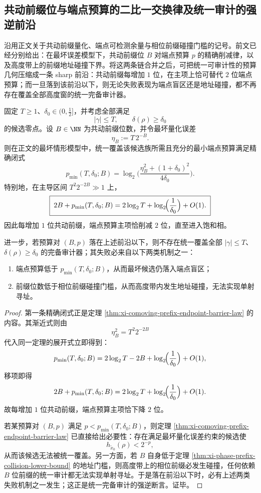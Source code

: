 \subsection{共动前缀位与端点预算的二比一交换律及统一审计的强逆前沿}\label{subsec:conclusion-comoving-prefix-endpoint-budget-strong-frontier}
沿用正文关于共动前缀量化、端点可检测余量与相位前缀碰撞门槛的记号。前文已经分别给出：在最坏误差模型下，共动前缀位 \(B\) 对端点预算 \(p\) 的精确削减律，以及高度带上的前缀地址碰撞下界。将这两条链合并之后，可把统一可审计性的预算几何压缩成一条 sharp 前沿：共动前缀每增加 \(1\) 位，在主项上恰可替代 \(2\) 位端点预算；而一旦落到该前沿以下，则无论失败表现为端点盲区还是地址碰撞，都不再存在覆盖全部高度窗的统一完备审计器。

\begin{theorem}[二比一预算交换与统一审计的强逆前沿]\label{thm:conclusion-comoving-prefix-endpoint-twoforone-strong-frontier}
固定 \(T\ge 1\)、\(\delta_0\in(0,\tfrac12]\)，并考虑全部满足
\[
|\gamma|\le T,
\qquad
\delta(\rho)\ge \delta_0
\]
的候选零点。设 \(B\in\NN\) 为共动前缀位数，并令最坏量化误差
\[
\eta_B:=T\,2^{-B}.
\]
则在正文的最坏情形模型中，统一覆盖该候选族所需且充分的最小端点预算满足精确闭式
\[
\boxed{\;
p_{\min}(T,\delta_0;B)
=
\log_2\!\Biggl(
\frac{\eta_B^2+(1+\delta_0)^2}{4\delta_0}
\Biggr).\;}
\]
特别地，在主导区间 \(T^2 2^{-2B}\gg 1\) 上，
\[
\boxed{\;
2B+p_{\min}(T,\delta_0;B)
=
2\log_2 T+\log_2\!\Bigl(\frac1{\delta_0}\Bigr)+O(1).\;}
\]
因此每增加 \(1\) 位共动前缀，端点预算主项恰削减 \(2\) 位，直至进入饱和相。

进一步，若预算对 \((B,p)\) 落在上述前沿以下，则不存在统一覆盖全部 \(|\gamma|\le T\)、\(\delta(\rho)\ge \delta_0\) 的完备审计器；其失败必来自以下两类机制之一：
\begin{enumerate}
  \item 端点预算低于 \(p_{\min}(T,\delta_0;B)\)，从而最坏候选仍落入端点盲区；
  \item 前缀位数低于相位前缀碰撞门槛，从而高度带内发生地址碰撞，无法实现单射寻址。
\end{enumerate}
\end{theorem}
\begin{proof}
第一条精确闭式正是定理 \ref{thm:xi-comoving-prefix-endpoint-barrier-law} 的内容。其渐近式则由
\[
\eta_B^2=T^2 2^{-2B}
\]
代入同一定理的展开式立即得到：
\[
p_{\min}(T,\delta_0;B)
=
2\log_2T-2B+\log_2\!\Bigl(\frac1{\delta_0}\Bigr)+O(1),
\]
移项即得
\[
2B+p_{\min}(T,\delta_0;B)
=
2\log_2T+\log_2\!\Bigl(\frac1{\delta_0}\Bigr)+O(1).
\]
故每增加 \(1\) 位共动前缀，端点预算主项恰下降 \(2\) 位。

若某预算对 \((B,p)\) 满足 \(p<p_{\min}(T,\delta_0;B)\)，则定理 \ref{thm:xi-comoving-prefix-endpoint-barrier-law} 已直接给出必要性：存在满足最坏量化误差约束的候选使
\[
h_{\tilde x_0}(\rho)<2^{-p},
\]
从而该候选无法被统一覆盖。另一方面，若 \(B\) 自身低于定理 \ref{thm:xi-phase-prefix-collision-lower-bound} 的地址门槛，则高度带上的相位前缀必发生碰撞，任何依赖 \(B\) 位前缀的统一审计都无法实现单射寻址。于是落在前沿以下时，必有上述两类失败机制之一发生；这正是统一完备审计的强逆断言。证毕。
\end{proof}

